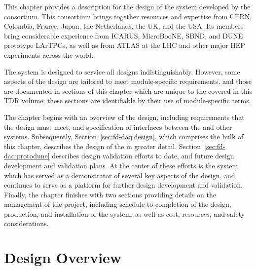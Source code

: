 This chapter provides a description for the design of the 
  system developed by the  
 consortium. 
This consortium brings together resources and expertise from CERN,
Colombia, France, Japan, the Netherlands, the UK, and the USA. 
Its members bring considerable experience from ICARUS, MicroBooNE,
SBND, and
DUNE prototype LArTPCs, as well as from ATLAS at the LHC and other major
HEP experiments across the world.

The system is designed %
to service all 
 designs indistinguishably. %
However, some aspects of the  design are tailored to meet
module-specific requirements, and those are documented in sections of this chapter which are 
unique to the  covered in this TDR volume;  
these sections are %
identifiable by their use of module-specific terms.

The chapter begins with an overview of the  design,
including requirements that the design must meet, and specification of
interfaces between the   and other   systems. 
Subsequently, Section~\ref{sec:fd-daq:design}, which comprises the
bulk of this chapter, describes the design of the 
 in greater detail.
Section~\ref{sec:fd-daq:protodune} describes design validation efforts
to date, and future design development and validation plans. At the
center of these efforts is the 
  system, which has served as a demonstrator of several
key aspects of the      design, and continues to serve as a
platform for further design development and validation. 
Finally, the chapter finishes with two sections providing details on
the management of the
 project, including schedule to completion of the design, 
production, and installation of the system, as well as cost, resources, and
safety considerations.

\section{Design Overview}
\label{sec:fd-daq:requirements}

